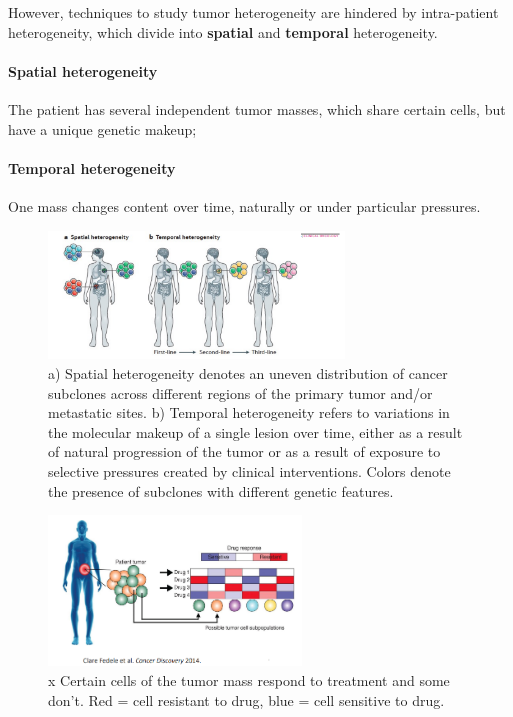 However, techniques to study tumor heterogeneity are hindered by intra-patient heterogeneity, which divide into \textbf{spatial} and \textbf{temporal} heterogeneity. 

\paragraph*{Spatial heterogeneity}
	The patient has several independent tumor masses, which share certain cells, but have a unique genetic makeup;

\paragraph*{Temporal heterogeneity}
	One mass changes content over time, naturally or under particular pressures.


\begin{figure}[H]
	\centering
	\includegraphics[width=0.7\textwidth]{heterogeneity.png}
	\caption{a) Spatial heterogeneity denotes an uneven distribution of cancer subclones across different regions of the primary tumor and/or metastatic sites. b) Temporal heterogeneity refers to variations in the molecular makeup of a single lesion over time, either as a result of natural progression of the tumor or as a result of exposure to selective pressures created by clinical interventions. Colors denote the presence of subclones with different genetic features.}
	\label{fig:hetero}
\end{figure}

\begin{figure}[H]
	\centering
	\includegraphics[width=0.6\textwidth]{treatment.png}
	\caption{x Certain cells of the tumor mass respond to treatment and some don't. Red = cell resistant to drug, blue = cell sensitive to drug. }
	\label{fig:hetero}
\end{figure}

